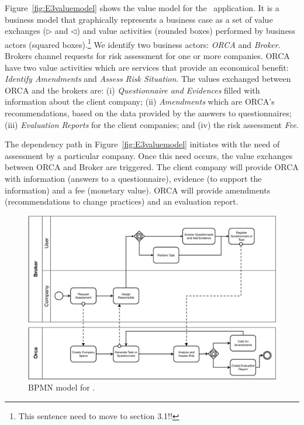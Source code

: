 Figure~\ref{fig:E3valuemodel} shows the value model for the \FlyingPig\ application.
It is a business model that graphically represents a business case as a set of value exchanges ($\triangleright$ and $\triangleleft$) and value activities (rounded boxes) performed by business actors (squared boxes).\footnote{\color{red} This sentence need to move to section 3.1!!}
We identify two business actors: \textsl{ORCA} and \textsl{Broker}. 
Brokers channel requests for risk assessment for one or more companies. 
ORCA have two value activities which are services that provide an economical benefit:  \textsl{Identify Amendments} and \textsl{Assess Risk Situation}. 
The values exchanged between ORCA and the brokers are: 
(i) \textsl{Questionnaire and Evidences} filled with information about the client company;
(ii) \textsl{Amendments} which are ORCA's recommendations, based on the data provided by the answers to questionnaires; 
(iii) \textsl{Evaluation Reports} for the client companies; 
and 
(iv) the risk assessment \textsl{Fee}.

The dependency path in Figure~\ref{fig:E3valuemodel} initiates with the need of assessment by a particular company. 
Once this need occurs, the value exchanges between ORCA and Broker are triggered. 
The client company will provide ORCA with information (answers to a questionnaire), evidence (to support the information) and a fee (monetary value).
ORCA will provide amendments (recommendations to change practices) and an evaluation report. 

\begin{figure}[t]
\centering
\includegraphics[width=1.0\textwidth]{figs/BPMN_GCP.pdf}
\caption{BPMN model for \FlyingPig.\label{fig:BPMNmodel}}
\end{figure}

